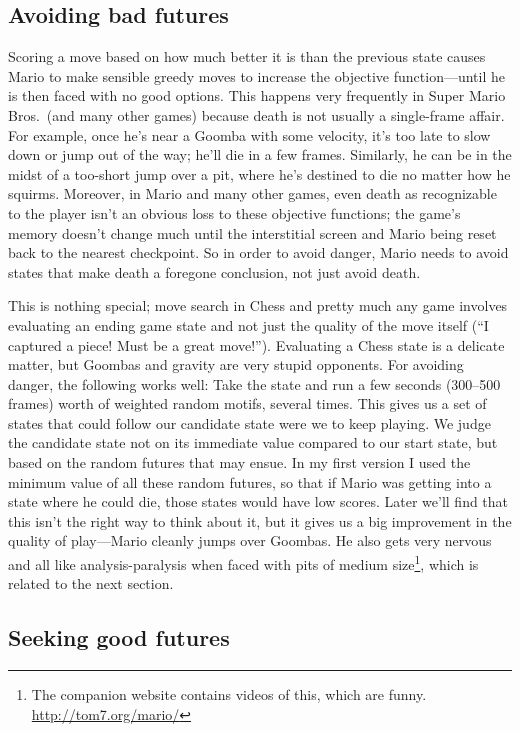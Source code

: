 \documentclass[twocolumn]{article}
\begin{document}
\subsection{Avoiding bad futures}

Scoring a move based on how much better it is than the previous state
causes Mario to make sensible greedy moves to increase the objective
function---until he is then faced with no good options. This happens
very frequently in Super Mario Bros.~(and many other games) because
death is not usually a single-frame affair. For example, once he's
near a Goomba with some velocity, it's too late to slow down or jump
out of the way; he'll die in a few frames. Similarly, he can be in the
midst of a too-short jump over a pit, where he's destined to die no
matter how he squirms. Moreover, in Mario and many other games, even
death as recognizable to the player isn't an obvious loss to these
objective functions; the game's memory doesn't change much until the
interstitial screen and Mario being reset back to the nearest
checkpoint. So in order to avoid danger, Mario needs to avoid states
that make death a foregone conclusion, not just avoid death.

This is nothing special; move search in Chess and pretty much any game
involves evaluating an ending game state and not just the quality of
the move itself (``I captured a piece! Must be a great move!'').
Evaluating a Chess state is a delicate matter, but Goombas and gravity
are very stupid opponents. For avoiding danger, the following works
well: Take the state and run a few seconds (300--500 frames) worth of
weighted random motifs, several times. This gives us a set of states
that could follow our candidate state were we to keep playing. We
judge the candidate state not on its immediate value compared to our
start state, but based on the random futures that may ensue. In my
first version I used the minimum value of all these random futures, so
that if Mario was getting into a state where he could die, those
states would have low scores. Later we'll find that this isn't the
right way to think about it, but it gives us a big improvement in the
quality of play---Mario cleanly jumps over Goombas. He also gets very
nervous and all like analysis-paralysis when faced with pits of medium
size\footnote{The companion website contains videos of this, which are
  funny. \url{http://tom7.org/mario/}}, which is related to the next
section.

\subsection{Seeking good futures}
\end{document}
